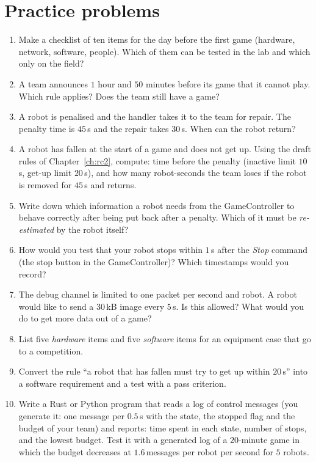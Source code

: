 \section*{Practice problems}
\begin{enumerate}[label=\textbf{\thechapter.\arabic*}]
  \item Make a checklist of ten items for the day before the first game (hardware, network, software, people). Which of them can be tested in the lab and which only on the field?
  \item A team announces $1$ hour and $50$ minutes before its game that it cannot play. Which rule applies? Does the team still have a game?
  \item A robot is penalised and the handler takes it to the team for repair. The penalty time is $45$\,s and the repair takes $30$\,s. When can the robot return?
  \item A robot has fallen at the start of a game and does not get up. Using the draft rules of Chapter~\ref{ch:rc2}, compute: time before the penalty (inactive limit $10$\,s, get-up limit $20$\,s), and how many robot-seconds the team loses if the robot is removed for $45$\,s and returns.
  \item Write down which information a robot needs from the GameController to behave correctly after being put back after a penalty. Which of it must be \emph{re-estimated} by the robot itself?
  \item How would you test that your robot stops within $1$\,s after the \emph{Stop} command (the stop button in the GameController)? Which timestamps would you record?
  \item The debug channel is limited to one packet per second and robot. A robot would like to send a $30$\,kB image every $5$\,s. Is this allowed? What would you do to get more data out of a game?
  \item List five \emph{hardware} items and five \emph{software} items for an equipment case that go to a competition.
  \item Convert the rule ``a robot that has fallen must try to get up within $20$\,s'' into a software requirement and a test with a pass criterion.
  \item[\textbf{\thechapter.10}$\star$] Write a Rust or Python program that reads a log of control messages (you generate it: one message per $0.5$\,s with the state, the stopped flag and the budget of your team) and reports: time spent in each state, number of stops, and the lowest budget. Test it with a generated log of a $20$-minute game in which the budget decreases at $1.6$\,messages per robot per second for $5$ robots.
\end{enumerate}
